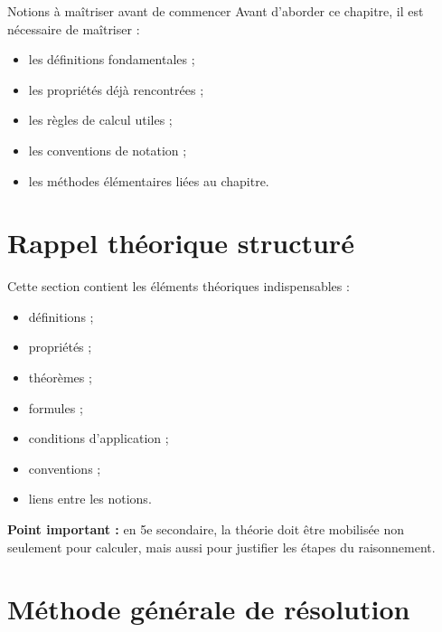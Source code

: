 \documentclass[11pt,a4paper]{article}
\begin{document}
\begin{cadregris}{Notions à maîtriser avant de commencer}
Avant d’aborder ce chapitre, il est nécessaire de maîtriser :
\begin{itemize}
    \item les définitions fondamentales ;
    \item les propriétés déjà rencontrées ;
    \item les règles de calcul utiles ;
    \item les conventions de notation ;
    \item les méthodes élémentaires liées au chapitre.
\end{itemize}
\end{cadregris}

\section{Rappel théorique structuré}

\begin{cadretheorie}
Cette section contient les éléments théoriques indispensables :

\begin{itemize}
    \item définitions ;
    \item propriétés ;
    \item théorèmes ;
    \item formules ;
    \item conditions d’application ;
    \item conventions ;
    \item liens entre les notions.
\end{itemize}

\medskip

\textbf{Point important :} en 5e secondaire, la théorie doit être mobilisée non seulement pour calculer, mais aussi pour justifier les étapes du raisonnement.
\end{cadretheorie}

\section{Méthode générale de résolution}
\end{document}

